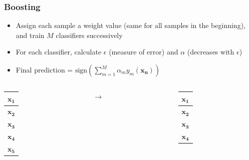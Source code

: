 \documentclass{beamer}
\begin{document}
    \begin{frame}
        \frametitle{Boosting}
        \begin{itemize}
            \item{Assign each sample a weight value (same for all samples in the beginning), and train $M$ classifiers successively}
            \item{For each classifier, calculate $\epsilon$ (measure of error) and $\alpha$ (decreases with $\epsilon$)}
            \item{Final prediction = $\mathrm{sign}(\displaystyle \sum_{m = 1}^{M} \alpha_m y_m(\mathbf{x_n}))$}
        \end{itemize}
        \begin{columns}
            \begin{column}{0.3\textwidth}
                \begin{center}
                    \begin{tabular}{| c |}
                        \hline
                        $\mathbf{x_1}$\\
                        \hline
                        $\mathbf{x_2}$\\
                        \hline
                        $\mathbf{x_3}$\\
                        \hline
                        $\mathbf{x_4}$\\
                        \hline
                        $\mathbf{x_5}$\\
                        \hline
                    \end{tabular}
                \end{center}
            \end{column}
            \begin{column}{0.05\textwidth}
                $\rightarrow$
            \end{column}
            \begin{column}{0.3\textwidth}
                \begin{center}
                    \begin{tabular}{| c |}
                        \hline
                        $\mathbf{x_1}$\\
                        \hline
                        $\mathbf{x_2}$\\
                        \hline
                        $\mathbf{x_3}$\\
                        \hline
                        $\mathbf{x_4}$\\

\end{tabular}
\end{center}
\end{column}
\end{columns}
\end{frame}
\end{document}
